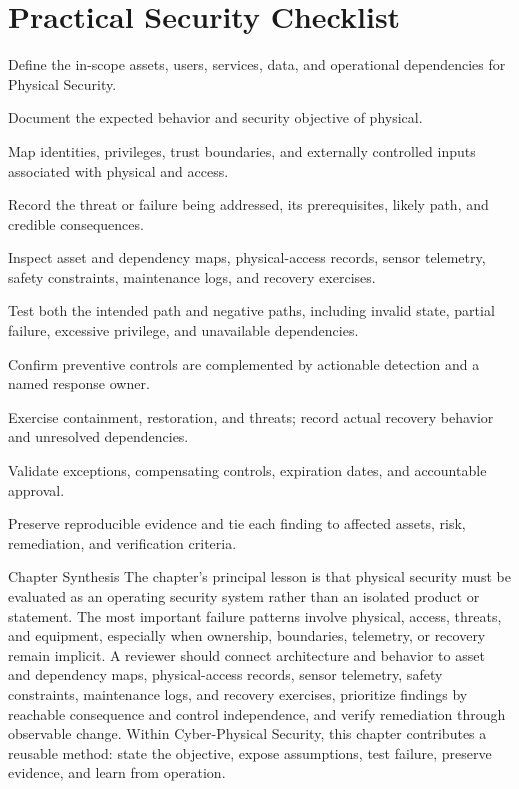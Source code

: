 \documentclass[11pt,letterpaper]{article}
\begin{document}
\section*{Practical Security Checklist}
\begin{CornellChecklist}
\item Define the in-scope assets, users, services, data, and operational dependencies for Physical Security.
\item Document the expected behavior and security objective of physical.
\item Map identities, privileges, trust boundaries, and externally controlled inputs associated with physical and access.
\item Record the threat or failure being addressed, its prerequisites, likely path, and credible consequences.
\item Inspect asset and dependency maps, physical-access records, sensor telemetry, safety constraints, maintenance logs, and recovery exercises.
\item Test both the intended path and negative paths, including invalid state, partial failure, excessive privilege, and unavailable dependencies.
\item Confirm preventive controls are complemented by actionable detection and a named response owner.
\item Exercise containment, restoration, and threats; record actual recovery behavior and unresolved dependencies.
\item Validate exceptions, compensating controls, expiration dates, and accountable approval.
\item Preserve reproducible evidence and tie each finding to affected assets, risk, remediation, and verification criteria.
\end{CornellChecklist}
\begin{CornellSummaryBox}{Chapter Synthesis}
The chapter's principal lesson is that physical security must be evaluated as an operating security system rather than an isolated product or statement. The most important failure patterns involve physical, access, threats, and equipment, especially when ownership, boundaries, telemetry, or recovery remain implicit. A reviewer should connect architecture and behavior to asset and dependency maps, physical-access records, sensor telemetry, safety constraints, maintenance logs, and recovery exercises, prioritize findings by reachable consequence and control independence, and verify remediation through observable change. Within Cyber-Physical Security, this chapter contributes a reusable method: state the objective, expose assumptions, test failure, preserve evidence, and learn from operation.
\end{CornellSummaryBox}
\end{document}
